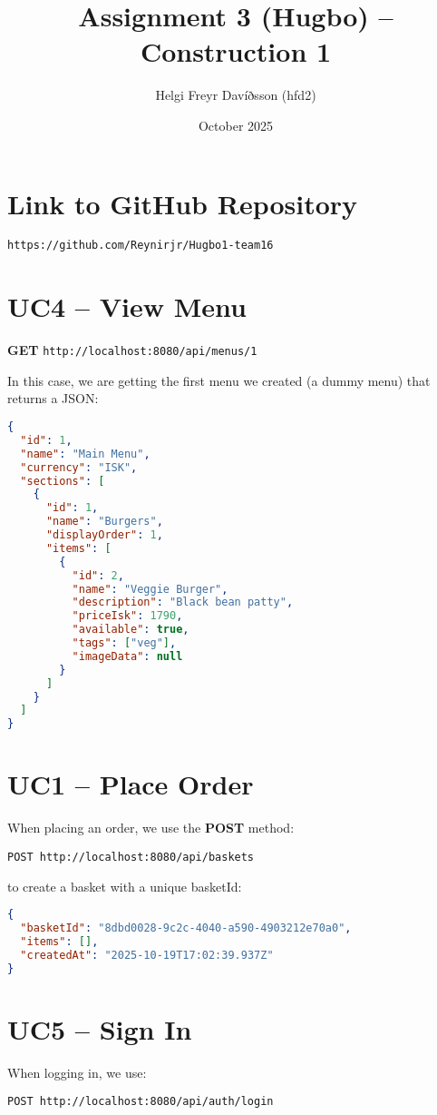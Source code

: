 \documentclass{article}
\title{Assignment 3 (Hugbo) -- Construction 1}
\author{Helgi Freyr Davíðsson (hfd2)}
\date{October 2025}
\begin{document}
\maketitle

\section*{Link to GitHub Repository}
\texttt{https://github.com/Reynirjr/Hugbo1-team16}
\newpage
\section*{UC4 -- View Menu}

\textbf{GET} \texttt{http://localhost:8080/api/menus/1}

In this case, we are getting the first menu we created (a dummy menu) that returns a JSON:
\begin{lstlisting}[language=json]
{
  "id": 1,
  "name": "Main Menu",
  "currency": "ISK",
  "sections": [
    {
      "id": 1,
      "name": "Burgers",
      "displayOrder": 1,
      "items": [
        {
          "id": 2,
          "name": "Veggie Burger",
          "description": "Black bean patty",
          "priceIsk": 1790,
          "available": true,
          "tags": ["veg"],
          "imageData": null
        }
      ]
    }
  ]
}
\end{lstlisting}

\section*{UC1 -- Place Order}

When placing an order, we use the \textbf{POST} method:

\texttt{POST http://localhost:8080/api/baskets}

to create a basket with a unique basketId:
\begin{lstlisting}[language=json]
{
  "basketId": "8dbd0028-9c2c-4040-a590-4903212e70a0",
  "items": [],
  "createdAt": "2025-10-19T17:02:39.937Z"
}
\end{lstlisting}

\section*{UC5 -- Sign In}

When logging in, we use:
\begin{lstlisting}
POST http://localhost:8080/api/auth/login
\end{lstlisting}
\end{document}

